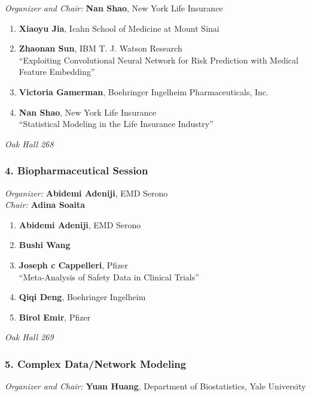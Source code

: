 \emph{Organizer and Chair:} \textbf{Nan Shao}, New York Life Insurance

\begin{enumerate}
\item \textbf{Xiaoyu Jia}, Icahn School of Medicine at Mount Sinai 
\item \textbf{Zhaonan Sun}, IBM T. J. Watson Research \\
``Exploiting Convolutional Neural Network for Risk Prediction with Medical Feature Embedding''
\item \textbf{Victoria Gamerman}, Boehringer Ingelheim Pharmaceuticals, Inc. 
\item \textbf{Nan Shao}, New York Life Insurance \\
``Statistical Modeling in the Life Insurance Industry''
\end{enumerate}

\emph{Oak Hall 268} \\[.5em]

\subsubsection*{4. Biopharmaceutical Session}

\emph{Organizer:} \textbf{Abidemi Adeniji}, EMD Serono \\
\emph{Chair:} \textbf{Adina Soaita}

\begin{enumerate}
\item \textbf{Abidemi Adeniji}, EMD Serono 
\item \textbf{Bushi Wang} 
\item \textbf{Joseph c Cappelleri}, Pfizer \\
``Meta-Analysis of Safety Data in Clinical Trials''
\item \textbf{Qiqi Deng}, Boehringer Ingelheim 
\item \textbf{Birol Emir}, Pfizer 
\end{enumerate}

\emph{Oak Hall 269} \\[.5em]

\subsubsection*{5. Complex Data/Network Modeling}

\emph{Organizer and Chair:} \textbf{Yuan Huang}, Department of Biostatistics, Yale University

